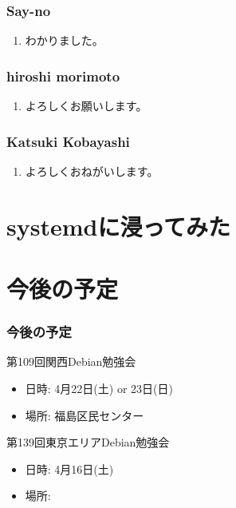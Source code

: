 \documentclass[cjk,dvipdfmx,10pt,compress,%
hyperref={bookmarks=true,bookmarksnumbered=true,bookmarksopen=false,%
colorlinks=false,%
pdftitle={第 108 回 関西 Debian 勉強会},%
pdfauthor={倉敷・のがた・佐々木・かわだ},%
pdfsubject={資料},%
}]{beamer}
\begin{document}
\begin{frame}
  \frametitle{ Say-no }
  \begin{enumerate}
  \item わかりました。
  \end{enumerate}
\end{frame}

\begin{frame}
  \frametitle{ hiroshi morimoto }
  \begin{enumerate}
  \item よろしくお願いします。
  \end{enumerate}
\end{frame}

\begin{frame}
  \frametitle{ Katsuki Kobayashi }
  \begin{enumerate}
  \item よろしくおねがいします。
  \end{enumerate}
\end{frame}


\section{systemdに浸ってみた}

\section{今後の予定}
\begin{frame}[fragile]
  \frametitle{今後の予定}

  \begin{block}{第109回関西Debian勉強会}
    \begin{itemize}
    \item 日時: 4月22日(土) or 23日(日)
    \item 場所: 福島区民センター
    \end{itemize}
  \end{block}

  \begin{block}{第139回東京エリアDebian勉強会}
    \begin{itemize}
    \item 日時: 4月16日(土)
    \item 場所:
    \end{itemize}
  \end{block}

\end{frame}

\takahashi[50]{  }
\end{document}
